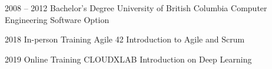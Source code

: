 \documentclass[9pt]{developercv} %
\begin{document}


\begin{entrylist}
	\entry
		{2008 -- 2012}
		{Bachelor's Degree}
		{University of British Columbia}
		{Computer Engineering Software Option}
\end{entrylist}

\begin{entrylist}
	\entry
		{2018}
		{In-person Training}
		{Agile 42}
		{Introduction to Agile and Scrum}
\end{entrylist}

\begin{entrylist}
	\entry
		{2019}
		{Online Training}
		{CLOUDXLAB}
		{Introduction on Deep Learning}
\end{entrylist}
\end{document}
